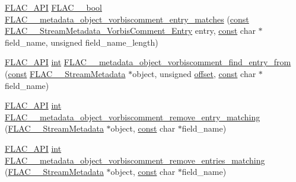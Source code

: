 \begin{DoxyCompactItemize}
\item 
\hyperlink{group__flac__export_ga56ca07df8a23310707732b1c0007d6f5}{F\+L\+A\+C\+\_\+\+A\+PI} \hyperlink{ordinals_8h_a95103469f1cbd78b8cf250194985b34e}{F\+L\+A\+C\+\_\+\+\_\+bool} \hyperlink{group__flac__metadata__object_gac31ee3de9f9931628f120cb611bb0f20}{F\+L\+A\+C\+\_\+\+\_\+metadata\+\_\+object\+\_\+vorbiscomment\+\_\+entry\+\_\+matches} (\hyperlink{getopt1_8c_a2c212835823e3c54a8ab6d95c652660e}{const} \hyperlink{struct_f_l_a_c_____stream_metadata___vorbis_comment___entry}{F\+L\+A\+C\+\_\+\+\_\+\+Stream\+Metadata\+\_\+\+Vorbis\+Comment\+\_\+\+Entry} entry, \hyperlink{getopt1_8c_a2c212835823e3c54a8ab6d95c652660e}{const} char $\ast$field\+\_\+name, unsigned field\+\_\+name\+\_\+length)
\item 
\hyperlink{group__flac__export_ga56ca07df8a23310707732b1c0007d6f5}{F\+L\+A\+C\+\_\+\+A\+PI} \hyperlink{xmltok_8h_a5a0d4a5641ce434f1d23533f2b2e6653}{int} \hyperlink{group__flac__metadata__object_gae094c1ce4f248d49e8c099661bd5288e}{F\+L\+A\+C\+\_\+\+\_\+metadata\+\_\+object\+\_\+vorbiscomment\+\_\+find\+\_\+entry\+\_\+from} (\hyperlink{getopt1_8c_a2c212835823e3c54a8ab6d95c652660e}{const} \hyperlink{struct_f_l_a_c_____stream_metadata}{F\+L\+A\+C\+\_\+\+\_\+\+Stream\+Metadata} $\ast$object, unsigned \hyperlink{layer12_8c_a33d71f23ba2052d17f0b754dc35265b0}{offset}, \hyperlink{getopt1_8c_a2c212835823e3c54a8ab6d95c652660e}{const} char $\ast$field\+\_\+name)
\item 
\hyperlink{group__flac__export_ga56ca07df8a23310707732b1c0007d6f5}{F\+L\+A\+C\+\_\+\+A\+PI} \hyperlink{xmltok_8h_a5a0d4a5641ce434f1d23533f2b2e6653}{int} \hyperlink{group__flac__metadata__object_ga6812052a110800bef2f4139017501507}{F\+L\+A\+C\+\_\+\+\_\+metadata\+\_\+object\+\_\+vorbiscomment\+\_\+remove\+\_\+entry\+\_\+matching} (\hyperlink{struct_f_l_a_c_____stream_metadata}{F\+L\+A\+C\+\_\+\+\_\+\+Stream\+Metadata} $\ast$object, \hyperlink{getopt1_8c_a2c212835823e3c54a8ab6d95c652660e}{const} char $\ast$field\+\_\+name)
\item 
\hyperlink{group__flac__export_ga56ca07df8a23310707732b1c0007d6f5}{F\+L\+A\+C\+\_\+\+A\+PI} \hyperlink{xmltok_8h_a5a0d4a5641ce434f1d23533f2b2e6653}{int} \hyperlink{group__flac__metadata__object_ga525525f5f21b1caee776cba3cfb6d72f}{F\+L\+A\+C\+\_\+\+\_\+metadata\+\_\+object\+\_\+vorbiscomment\+\_\+remove\+\_\+entries\+\_\+matching} (\hyperlink{struct_f_l_a_c_____stream_metadata}{F\+L\+A\+C\+\_\+\+\_\+\+Stream\+Metadata} $\ast$object, \hyperlink{getopt1_8c_a2c212835823e3c54a8ab6d95c652660e}{const} char $\ast$field\+\_\+name)
\item 

\end{DoxyCompactItemize}
